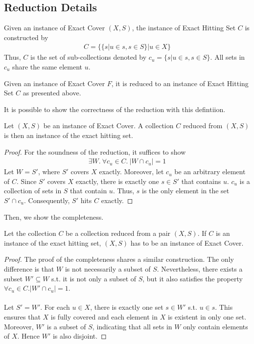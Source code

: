 \subsection{Reduction Details}
Given an instance of Exact Cover $(X, S)$, the instance of Exact Hitting Set $C$ is constructed by 
\begin{align*}
    C = \{\{s | u \in s, s \in S \} | u \in X\}
\end{align*}
Thus, $C$ is the set of sub-collections denoted by $c_u = \{s | u \in s, s \in S\}$. All sets in $c_u$ share the same element $u$.
\begin{definition}
    Given an instance of Exact Cover $F$, 
    it is reduced to an instance of Exact Hitting Set $C$ as presented above.
\end{definition}
It is possible to show the correctness of the reduction with this defintiion.
\begin{lemma}[Soundess]
    Let $(X, S)$ be an instance of Exact Cover. A collection $C$ reduced from $(X, S)$ is then an instance of the exact hitting set.
\end{lemma}
\begin{proof}
For the soundness of the reduction, it suffices to show 
\begin{align*}
    \exists W.\ \forall c_u \in C.\ |W \cap c_u| = 1
\end{align*}
Let $W = S'$, where $S'$ covers $X$ exactly. Moreover, let $c_u$ be an arbitrary element of $C$. 
Since $S'$ covers $X$ exactly, there is exactly one $s \in S'$ that contains $u$. 
$c_u$ is a collection of sets in $S$ that contain $u$.
Thus, $s$ is the only element in the set $S' \cap c_u$. 
Consequently, $S'$ hits $C$ exactly.
\end{proof}
Then, we show the completeness.
\begin{lemma}[Completeness]
    Let the collection $C$ be a collection reduced from a pair $(X, S)$. If $C$ is an instance of the exact hitting set, 
    $(X, S)$ has to be an instance of Exact Cover.
\end{lemma}
\begin{proof}
The proof of the completeness shares a similar construction. 
The only difference is that $W$ is not necessarily a subset of $S$.
Nevertheless, there exists a subset $W' \subseteq W$ s.t. it is not only a subset of $S$, but it
also satisfies the property $\forall c_u \in C. |W' \cap c_u| = 1$. \\\\
Let $S' = W'$. For each $u \in X$, there is exactly one set $s \in W'$ s.t. $u \in s$. 
This ensures that $X$ is fully covered and each element in $X$ is existent in only one set.
Moreover, $W'$ is a subset of $S$, indicating that all sets in $W$ only contain elements of $X$. 
Hence $W'$ is also disjoint.  
\end{proof}
